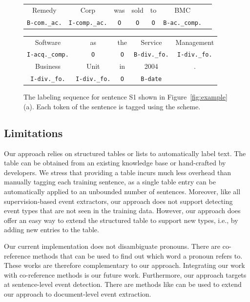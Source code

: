 \begin{figure}[t!]
\centering
\scriptsize
\begin{tabular}{ccccccc}
\toprule
Remedy & Corp & was & sold & to & BMC & \\
\rowcolor{Gray} \texttt{B-com.\_ac.} & \texttt{I-comp.\_ac.} & \texttt{O} & \texttt{O} & \texttt{O} & \texttt{B-ac.\_comp.} &\\
\end{tabular}
\begin{tabular}{ccccc}
Software & as & the & Service &Management \\
\rowcolor{Gray} \texttt{I-acq.\_comp.} & \texttt{O} & \texttt{O} & \texttt{B-div.\_fo.} & \texttt{I-div.\_fo.} \\
Business & Unit & in & 2004 &.\\
\rowcolor{Gray} \texttt{I-div.\_fo.} & \texttt{I-div.\_fo.} & \texttt{O} & \texttt{B-date} &\\
\bottomrule
\end{tabular}

\caption{The labeling sequence for sentence S1 shown in Figure~\ref{fig:example} (a). Each token of the sentence is tagged using the \BIO
scheme. \label{fig:ls}}
\end{figure}

\subsection{Limitations}
Our approach relies on structured tables or lists to automatically label text. The table can be obtained from an existing knowledge base or
hand-crafted by developers. We stress that providing a table incurs much less overhead than manually tagging each training sentence, as a
single table entry can be automatically applied to an unbounded number of sentences.  Moreover, like all supervision-based event
extractors, our approach does not support detecting event types that are not seen in the training data. However, our approach does offer an
easy way to extend the structured table to support new types, i.e., by adding new entries to the table.


Our current implementation does not disambiguate pronouns. There are co-reference methods\FIXME{~\cite{}} that can be used to find out
which word a pronoun refers to. These works are therefore complementary to our approach. Integrating our work with co-reference methods is
our future work. Furthermore, our approach targets at sentence-level event detection. There are methods like \FIXME{\cite{}} can be used to
extend our approach to document-level event extraction.
